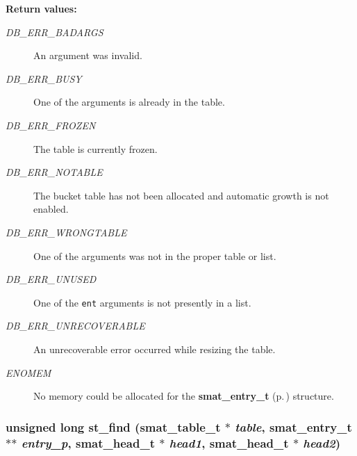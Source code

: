 \begin{Desc}
\item[{\bf Return values: }]\par
\begin{description}
\item[
{\em DB\_\-ERR\_\-BADARGS}]An argument was invalid. \item[
{\em DB\_\-ERR\_\-BUSY}]One of the arguments is already in the table. \item[
{\em DB\_\-ERR\_\-FROZEN}]The table is currently frozen. \item[
{\em DB\_\-ERR\_\-NOTABLE}]The bucket table has not been allocated and automatic growth is not enabled. \item[
{\em DB\_\-ERR\_\-WRONGTABLE}]One of the arguments was not in the proper table or list. \item[
{\em DB\_\-ERR\_\-UNUSED}]One of the {\tt ent} arguments is not presently in a list. \item[
{\em DB\_\-ERR\_\-UNRECOVERABLE}]An unrecoverable error occurred while resizing the table. \item[
{\em ENOMEM}]No memory could be allocated for the {\bf smat\_\-entry\_\-t} {\rm (p.\,\pageref{group__dbprim__smat_a2})} structure. \end{description}
\end{Desc}
\subsubsection{\setlength{\rightskip}{0pt plus 5cm}unsigned long st\_\-find ({\bf smat\_\-table\_\-t} $\ast$ {\em table}, {\bf smat\_\-entry\_\-t} $\ast$$\ast$ {\em entry\_\-p}, {\bf smat\_\-head\_\-t} $\ast$ {\em head1}, {\bf smat\_\-head\_\-t} $\ast$ {\em head2})}\label{group__dbprim__smat_a12}




